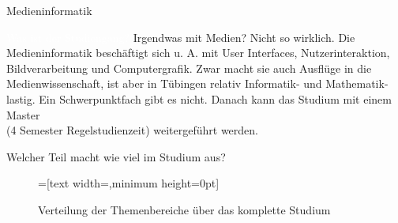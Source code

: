 
\begin{Huge}
    Medieninformatik
\end{Huge}

\begin{exampleblock}{\textcolor{white}{Was ist der Studiengang?}}
    Irgendwas mit Medien? Nicht so wirklich. Die Medieninformatik besch\"aftigt sich u. A. mit User Interfaces, Nutzerinteraktion, Bildverarbeitung und Computergrafik. Zwar macht sie auch Ausfl\"uge in die Medienwissenschaft, ist aber in T\"ubingen relativ Informatik- und Mathematik-lastig. Ein Schwerpunktfach gibt es nicht. Danach kann das Studium mit einem Master \\ (4 Semester Regelstudienzeit) weitergef\"uhrt werden.
\end{exampleblock}

\begin{block}{Welcher Teil macht wie viel im Studium aus?}
    \begin{figure}[h!]
        \vspace{-10pt}
        \begin{minipage}{\linewidth}
            \centering
            =[text width={},minimum height=0pt]
        \end{minipage}
        \caption{Verteilung der Themenbereiche \"uber das komplette Studium}
    \end{figure}
\end{block}

